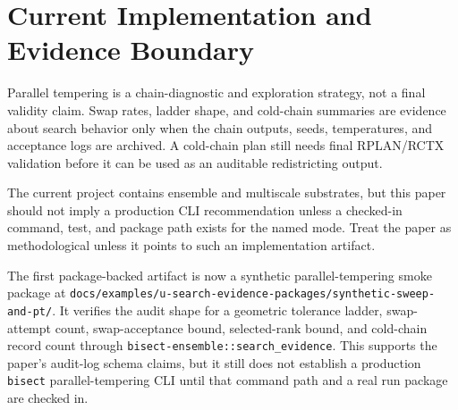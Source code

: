 \section{Current Implementation and Evidence Boundary}

Parallel tempering is a chain-diagnostic and exploration strategy, not a final
validity claim.  Swap rates, ladder shape, and cold-chain summaries are evidence
about search behavior only when the chain outputs, seeds, temperatures, and
acceptance logs are archived.  A cold-chain plan still needs final RPLAN/RCTX
validation before it can be used as an auditable redistricting output.

The current project contains ensemble and multiscale substrates, but this paper
should not imply a production CLI recommendation unless a checked-in command,
test, and package path exists for the named mode.  Treat the paper as
methodological unless it points to such an implementation artifact.

The first package-backed artifact is now a synthetic parallel-tempering smoke
package at
\texttt{docs/examples/u-search-evidence-packages/synthetic-sweep-and-pt/}.
It verifies the audit shape for a geometric tolerance ladder, swap-attempt count,
swap-acceptance bound, selected-rank bound, and cold-chain record count through
\texttt{bisect-ensemble::search\_evidence}.  This supports the paper's audit-log
schema claims, but it still does not establish a production \texttt{bisect}
parallel-tempering CLI until that command path and a real run package are
checked in.
